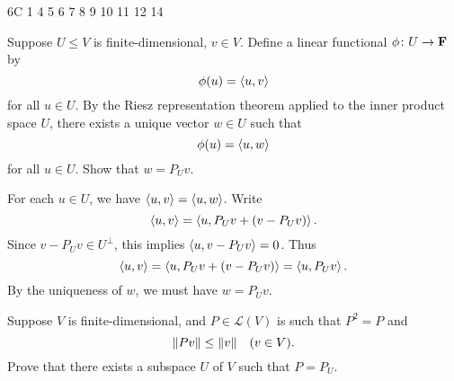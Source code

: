 6C 1 4 5 6 7 8 9 10 11 12 14

\begin{exercise}
\end{exercise}

\begin{exercise}
\end{exercise}

\begin{exercise}
\end{exercise}

\begin{exercise}
\end{exercise}

\begin{exercise}
\end{exercise}

\begin{exercise}
Suppose $U\le V$ is finite-dimensional, $v\in V$. Define a linear functional $\phi\colon U\to\mathbf F$ by
\[\phi(u)=\left\langle u,v\right\rangle\]
for all $u\in U$. By the Riesz representation theorem applied to the inner product space $U$, there exists a unique vector $w\in U$ such that
\[\phi(u)=\left\langle u,w\right\rangle\]
for all $u\in U$. Show that $w=P_U v$.
\end{exercise}

\begin{solution}
For each $u\in U$, we have $\left\langle u,v\right\rangle=\left\langle u,w\right\rangle$. Write
\[\left\langle u,v\right\rangle=\left\langle u,P_U v+(v-P_U v)\right\rangle.\]
Since $v-P_U v\in U^\perp$, this implies $\left\langle u,v-P_U v\right\rangle=0$. Thus
\[\left\langle u,v\right\rangle=\left\langle u,P_U v+(v-P_U v)\right\rangle=\left\langle u,P_U v\right\rangle.\]
By the uniqueness of $w$, we must have $w=P_U v$.
\end{solution}

\begin{exercise}
\end{exercise}

\begin{exercise}
Suppose $V$ is finite-dimensional, and $P\in\mathcal{L}(V)$ is such that $P^2=P$ and
\[\norm{Pv}\le\norm{v}\quad(v\in V).\]
Prove that there exists a subspace $U$ of $V$ such that $P=P_U$.
\end{exercise}

\begin{solution}

\end{solution}

\begin{exercise}
\end{exercise}

\begin{exercise}
\end{exercise}

\begin{exercise}
\end{exercise}